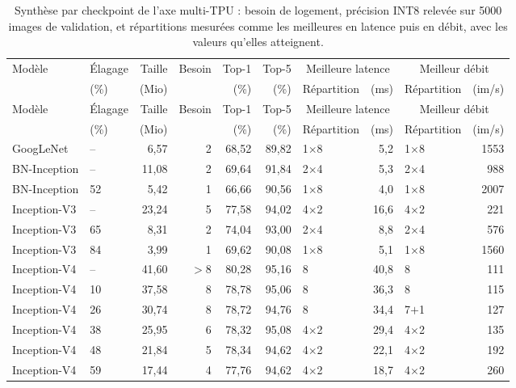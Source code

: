{\footnotesize
\setlength{\tabcolsep}{4pt}
\begin{longtable}{@{}llrrrrlrlr@{}}
\caption[Synthèse de l'axe multi-TPU]{Synthèse par checkpoint de l'axe multi-TPU : besoin de logement, précision INT8 relevée sur 5000 images de validation, et répartitions mesurées comme les meilleures en latence puis en débit, avec les valeurs qu'elles atteignent.}\label{tab:ann_multitpu}\\
\toprule
Modèle & Élagage & Taille & Besoin & Top-1 & Top-5 & \multicolumn{2}{c}{Meilleure latence} & \multicolumn{2}{c}{Meilleur débit} \\
\cmidrule(lr){7-8}\cmidrule(lr){9-10}
 & (\%) & (Mio) & & (\%) & (\%) & Répartition & (ms) & Répartition & (im/s) \\
\midrule
\endfirsthead
\toprule
Modèle & Élagage & Taille & Besoin & Top-1 & Top-5 & \multicolumn{2}{c}{Meilleure latence} & \multicolumn{2}{c}{Meilleur débit} \\
\cmidrule(lr){7-8}\cmidrule(lr){9-10}
 & (\%) & (Mio) & & (\%) & (\%) & Répartition & (ms) & Répartition & (im/s) \\
\midrule
\endhead
\bottomrule
\endfoot
GoogLeNet & -- & 6,57 & 2 & 68,52 & 89,82 & 1$\times$8 & 5,2 & 1$\times$8 & 1553 \\
\addlinespace[2pt]
BN-Inception & -- & 11,08 & 2 & 69,64 & 91,84 & 2$\times$4 & 5,3 & 2$\times$4 & 988 \\
BN-Inception & 52 & 5,42 & 1 & 66,66 & 90,56 & 1$\times$8 & 4,0 & 1$\times$8 & 2007 \\
\addlinespace[2pt]
Inception-V3 & -- & 23,24 & 5 & 77,58 & 94,02 & 4$\times$2 & 16,6 & 4$\times$2 & 221 \\
Inception-V3 & 65 & 8,31 & 2 & 74,04 & 93,00 & 2$\times$4 & 8,8 & 2$\times$4 & 576 \\
Inception-V3 & 84 & 3,99 & 1 & 69,62 & 90,08 & 1$\times$8 & 5,1 & 1$\times$8 & 1560 \\
\addlinespace[2pt]
Inception-V4 & -- & 41,60 & $>8$ & 80,28 & 95,16 & 8 & 40,8 & 8 & 111 \\
Inception-V4 & 10 & 37,58 & 8 & 78,78 & 95,06 & 8 & 36,3 & 8 & 115 \\
Inception-V4 & 26 & 30,74 & 8 & 78,72 & 94,76 & 8 & 34,4 & 7$+$1 & 127 \\
Inception-V4 & 38 & 25,95 & 6 & 78,32 & 95,08 & 4$\times$2 & 29,4 & 4$\times$2 & 135 \\
Inception-V4 & 48 & 21,84 & 5 & 78,34 & 94,62 & 4$\times$2 & 22,1 & 4$\times$2 & 192 \\
Inception-V4 & 59 & 17,44 & 4 & 77,76 & 94,62 & 4$\times$2 & 18,7 & 4$\times$2 & 260 \\

\end{longtable}}

